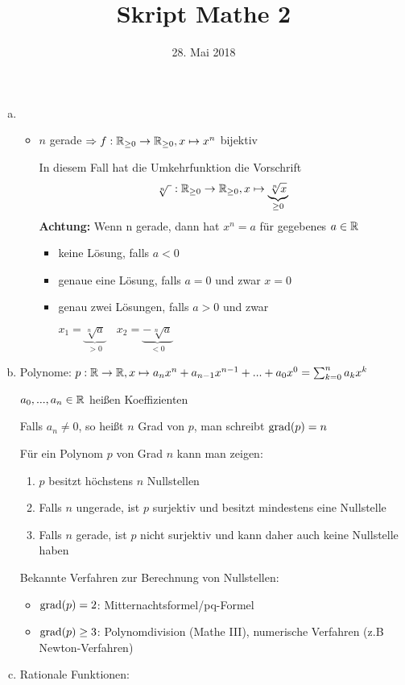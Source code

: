 \documentclass[10pt, a4paper, fleqn]{article}
\begin{document}
    \title{Skript Mathe 2}
    \date{28. Mai 2018}
    \maketitle
\fi
    \begin{enumerate}[a), start = 6]
        \item[]
        \begin{itemize}
            \item $n$ gerade
            $\Rightarrow f: \mathbb{R}_{\geq 0} \to \mathbb{R}_{\geq 0}, x \mapsto x^n$ bijektiv

            In diesem Fall hat die Umkehrfunktion die Vorschrift
            \[
                \sqrt[n]{\ }: \mathbb{R}_{\geq 0} \to \mathbb{R}_{\geq 0}, x \mapsto \underbrace{\sqrt[n]{x}}_{\geq 0}
            \]
            \textbf{Achtung: } Wenn n gerade, dann hat $x^n = a$ für gegebenes $a \in \mathbb{R}$
            \begin{itemize}
                \item keine Lösung, falls $a<0$
                \item genaue eine Lösung, falls $a=0$ und zwar $x=0$
                \item genau zwei Lösungen, falls $a>0$ und zwar

                $x_1 = \underbrace{\sqrt[n]{a}}_{> 0} \quad x_2 = \underbrace{-\sqrt[n]{a}}_{< 0}$
            \end{itemize}
        \end{itemize}
        \item Polynome: $p: \mathbb{R} \to \mathbb{R}, x \mapsto a_n x^n + a_{n-1} x^{n-1} + ... + a_0 x^0
            = \sum_{k=0}^n a_k x^k$

        $a_0, ..., a_n \in \mathbb{R}$ heißen Koeffizienten

        Falls $a_n \neq 0$, so heißt $n$ Grad von $p$, man schreibt $\text{grad}(p) = n$

        Für ein Polynom $p$ von Grad $n$ kann man zeigen:
        \begin{enumerate}[1.]
            \item $p$ besitzt höchstens $n$ Nullstellen
            \item Falls $n$ ungerade, ist $p$ surjektiv und besitzt mindestens eine Nullstelle
            \item Falls $n$ gerade, ist $p$ nicht surjektiv und kann daher auch keine Nullstelle haben
        \end{enumerate}
        Bekannte Verfahren zur Berechnung von Nullstellen:
        \begin{itemize}
            \item $\text{grad}(p) = 2$: Mitternachtsformel/pq-Formel
            \item $\text{grad}(p) \geq 3$: Polynomdivision (Mathe III), numerische Verfahren (z.B Newton-Verfahren)
        \end{itemize}
        \item Rationale Funktionen:


\end{enumerate}
\end{document}
